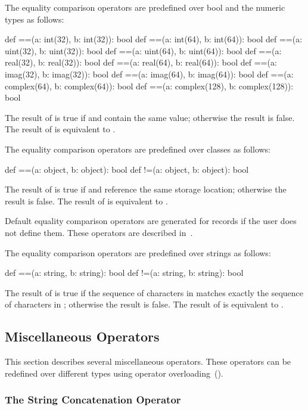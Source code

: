 The equality comparison operators are predefined over bool and the
numeric types as follows:
\begin{chapel}
def ==(a: int(32), b: int(32)): bool
def ==(a: int(64), b: int(64)): bool
def ==(a: uint(32), b: uint(32)): bool
def ==(a: uint(64), b: uint(64)): bool
def ==(a: real(32), b: real(32)): bool
def ==(a: real(64), b: real(64)): bool
def ==(a: imag(32), b: imag(32)): bool
def ==(a: imag(64), b: imag(64)): bool
def ==(a: complex(64), b: complex(64)): bool
def ==(a: complex(128), b: complex(128)): bool
\end{chapel}
The result of  is true if  and  contain
the same value; otherwise the result is false.  The result of  is equivalent to .

The equality comparison operators are predefined over classes as
follows:
\begin{chapel}
def ==(a: object, b: object): bool
def !=(a: object, b: object): bool
\end{chapel}
The result of  is true if  and  reference
the same storage location; otherwise the result is false.  The result
of  is equivalent to .

Default equality comparison operators are generated for records if the
user does not define them.  These operators are described
in~.

The equality comparison operators are predefined over strings as
follows:
\begin{chapel}
def ==(a: string, b: string): bool
def !=(a: string, b: string): bool
\end{chapel}
The result of  is true if the sequence of characters
in  matches exactly the sequence of characters in ;
otherwise the result is false.  The result of  is
equivalent to .

\subsection{Miscellaneous Operators}
\label{Miscellaneous_Operators}

This section describes several miscellaneous operators.  These
operators can be redefined over different types using operator
overloading~().

\subsubsection{The String Concatenation Operator}
\label{The_String_Concatenation_Operator}

